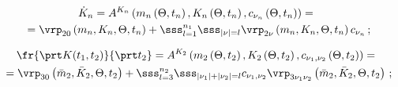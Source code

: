 \vspace*{-12pt}



\noindent

\begin{multline}

\dot K_n ={A}^{K_n} \left(m_n \left(\Theta,t_n\right), 

K_n \left(\Theta,t_n\right), c_{\nu_n} \left(\Theta, t_n\right)\right)

={}\\

{}=\vrp_{20} \left(m_n, K_n, \Theta, t_n\right)+ 

\sss_{l=1}^{n_1} \sss_{|\nu | =l} \vrp_{2\nu} 

\left(m_n , K_n, \Theta, t_n\right) c_{\nu_n}\,;

\label{e6.5-s2}

\end{multline}



\vspace*{-12pt}



\noindent

\begin{multline}

    \fr{\prt K(t_1, t_2)}{\prt t_2} ={A}^{K_2} 

    \left(m_2 \left(\Theta,t_2\right), K_2 \left(\Theta,t_2\right), 

    c_{\nu_1, \nu_2} \left(\Theta, t_2\right)\right) ={}\\

    {}=

    \vrp_{30} \left(\bar m_2, \bar K_2, \Theta, t_2\right)+  \sss_{l=3}^{n_2} \sss_{|\nu_1 | +|\nu_2 |=l} c_{\nu_1,\nu_2} \vrp_{3\nu_1\nu_2} 

\left(\bar m_2 , \bar K_2, \Theta, t_2\right)\,;

\label{e6.6-s2}

\end{multline}



\vspace*{-12pt}



\noindent

